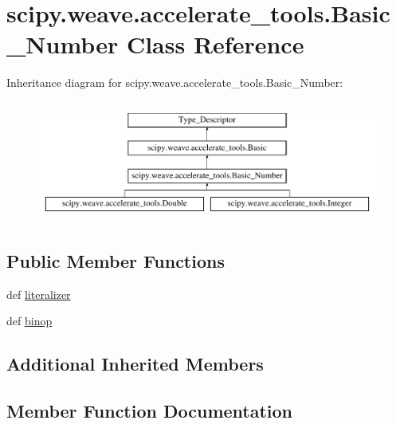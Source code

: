 \hypertarget{classscipy_1_1weave_1_1accelerate__tools_1_1Basic__Number}{}\section{scipy.\+weave.\+accelerate\+\_\+tools.\+Basic\+\_\+\+Number Class Reference}
\label{classscipy_1_1weave_1_1accelerate__tools_1_1Basic__Number}
Inheritance diagram for scipy.\+weave.\+accelerate\+\_\+tools.\+Basic\+\_\+\+Number\+:\begin{figure}[H]
\begin{center}
\leavevmode
\includegraphics[height=4.000000cm]{classscipy_1_1weave_1_1accelerate__tools_1_1Basic__Number}
\end{center}
\end{figure}
\subsection*{Public Member Functions}
\begin{DoxyCompactItemize}
\item 
def \hyperlink{classscipy_1_1weave_1_1accelerate__tools_1_1Basic__Number_a92eee0dc56d801e5545685f4157908ef}{literalizer}
\item 
def \hyperlink{classscipy_1_1weave_1_1accelerate__tools_1_1Basic__Number_a7560026bf4ed56cb9b3280b53048722f}{binop}
\end{DoxyCompactItemize}
\subsection*{Additional Inherited Members}


\subsection{Member Function Documentation}
\hypertarget{classscipy_1_1weave_1_1accelerate__tools_1_1Basic__Number_a7560026bf4ed56cb9b3280b53048722f}{}
